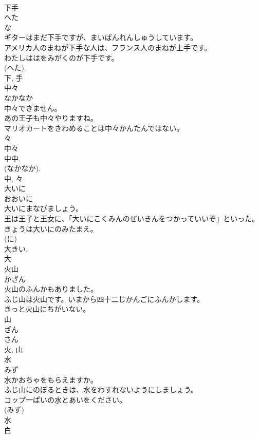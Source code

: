 \documentclass[8pt]{extreport}
\begin{document}
\begin{CJK}{UTF8}{min}
\\	下手	
\\	へた	
\\	な 
\\	ギターはまだ下手ですが、まいばんれんしゅうしています。	
\\	アメリカ人のまねが下手な人は、フランス人のまねが上手です。	
\\	わたしははをみがくのが下手です。	
\\	(へた). 
\\	下, 手	
\\	中々	
\\	なかなか	
\\	中々できません。	
\\	あの王子も中々やりますね。	
\\	マリオカートをきわめることは中々かんたんではない。	
\\	々 
\\	中々 
\\	中中. 
\\	(なかなか).
\\	中, 々	
\\	大いに	
\\	おおいに	
\\	大いにまなびましょう。	
\\	王は王子と王女に、「大いにこくみんのぜいきんをつかっていいぞ」といった。	
\\	きょうは大いにのみたまえ。	
\\	(に) 
\\	大きい. 
\\	大	
\\	火山	
\\	かざん	
\\	火山のふんかもありました。	
\\	ふじ山は火山です。いまから四十二じかんごにふんかします。	
\\	きっと火山にちがいない。	
\\	山 
\\	ざん 
\\	さん 
\\	火, 山	
\\	水	
\\	みず	
\\	水かおちゃをもらえますか。	
\\	ふじ山にのぼるときは、水をわすれないようにしましょう。	
\\	コップ一ぱいの水とあいをください。	
\\	(みず) 
\\	水	
\\	白	

\end{CJK}
\end{document}
